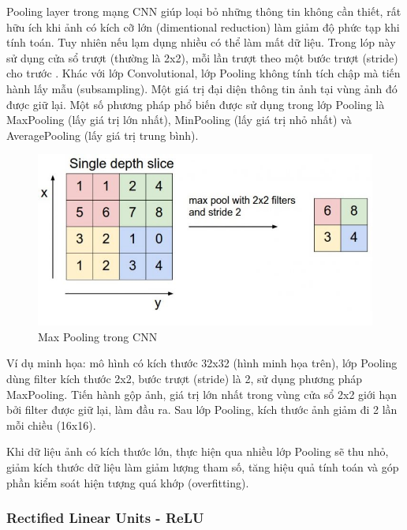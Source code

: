 Pooling layer trong mạng CNN giúp loại bỏ những thông tin không cần thiết, rất hữu ích khi ảnh có kích cỡ lớn (dimentional reduction) làm giảm độ phức tạp khi tính toán. Tuy nhiên nếu lạm dụng nhiều có thể làm mất dữ liệu. Trong lóp này sử dụng cửa sổ trượt (thường là 2x2), mỗi lần trượt theo một bước trượt (stride) cho trước . Khác với lớp Convolutional, lớp Pooling không tính tích chập mà tiến hành lấy mẫu (subsampling). Một giá trị đại diện thông tin ảnh tại vùng ảnh đó được giữ lại. Một số phương pháp phổ biến được sử dụng trong lớp Pooling là MaxPooling (lấy giá trị lớn nhất), MinPooling (lấy giá trị nhỏ nhất) và AveragePooling (lấy giá trị trung bình).
\begin{center}
    \begin{figure}[h!]
    \begin{center}
     \includegraphics[scale=0.5]{img/MaxPooling.png}
    \end{center}
    \caption{Max Pooling trong CNN \cite{maxpool}}
    \label{refhinh5}
    \end{figure}
\end{center}

Ví dụ minh họa: mô hình có kích thước 32x32 (hình minh họa trên), lớp Pooling dùng filter kích thước 2x2, bước trượt (stride) là 2, sử dụng phương pháp MaxPooling. Tiến hành gộp ảnh, giá trị lớn nhất trong vùng cửa sổ 2x2 giới hạn bởi filter được giữ lại, làm đầu ra. Sau lớp Pooling, kích thước ảnh giảm đi 2 lần mỗi chiều (16x16).

Khi dữ liệu ảnh có kích thước lớn, thực hiện qua nhiều lớp Pooling sẽ thu nhỏ, giảm kích thước dữ liệu làm giảm lượng tham số, tăng hiệu quả tính toán và góp phần kiểm soát hiện tượng quá khớp (overfitting).
\newpage
\subsubsection{Rectified Linear Units - ReLU}

